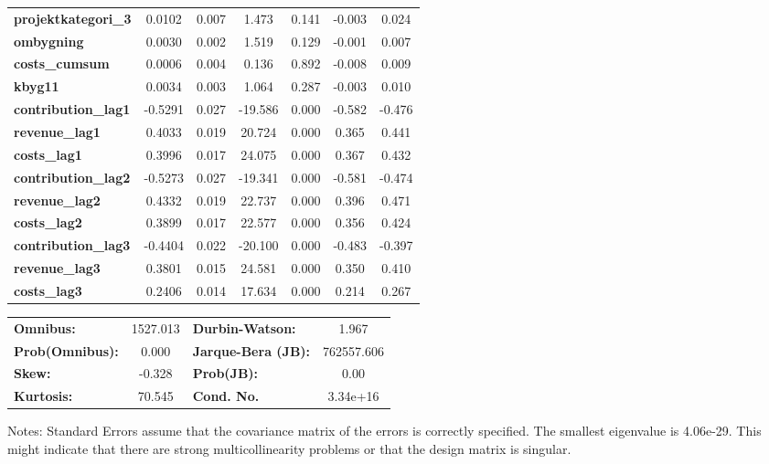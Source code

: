 \begin{center}
\begin{tabular}{lcccccc}
\textbf{projektkategori\_3}  &       0.0102  &        0.007     &     1.473  &         0.141        &       -0.003    &        0.024     \\
\textbf{ombygning}           &       0.0030  &        0.002     &     1.519  &         0.129        &       -0.001    &        0.007     \\
\textbf{costs\_cumsum}       &       0.0006  &        0.004     &     0.136  &         0.892        &       -0.008    &        0.009     \\
\textbf{kbyg11}              &       0.0034  &        0.003     &     1.064  &         0.287        &       -0.003    &        0.010     \\
\textbf{contribution\_lag1}  &      -0.5291  &        0.027     &   -19.586  &         0.000        &       -0.582    &       -0.476     \\
\textbf{revenue\_lag1}       &       0.4033  &        0.019     &    20.724  &         0.000        &        0.365    &        0.441     \\
\textbf{costs\_lag1}         &       0.3996  &        0.017     &    24.075  &         0.000        &        0.367    &        0.432     \\
\textbf{contribution\_lag2}  &      -0.5273  &        0.027     &   -19.341  &         0.000        &       -0.581    &       -0.474     \\
\textbf{revenue\_lag2}       &       0.4332  &        0.019     &    22.737  &         0.000        &        0.396    &        0.471     \\
\textbf{costs\_lag2}         &       0.3899  &        0.017     &    22.577  &         0.000        &        0.356    &        0.424     \\
\textbf{contribution\_lag3}  &      -0.4404  &        0.022     &   -20.100  &         0.000        &       -0.483    &       -0.397     \\
\textbf{revenue\_lag3}       &       0.3801  &        0.015     &    24.581  &         0.000        &        0.350    &        0.410     \\
\textbf{costs\_lag3}         &       0.2406  &        0.014     &    17.634  &         0.000        &        0.214    &        0.267     \\
\bottomrule
\end{tabular}
\begin{tabular}{lclc}
\textbf{Omnibus:}       & 1527.013 & \textbf{  Durbin-Watson:     } &     1.967   \\
\textbf{Prob(Omnibus):} &   0.000  & \textbf{  Jarque-Bera (JB):  } & 762557.606  \\
\textbf{Skew:}          &  -0.328  & \textbf{  Prob(JB):          } &      0.00   \\
\textbf{Kurtosis:}      &  70.545  & \textbf{  Cond. No.          } &  3.34e+16   \\
\bottomrule
\end{tabular}
\end{center}

Notes: \newline
 [1] Standard Errors assume that the covariance matrix of the errors is correctly specified. \newline
 [2] The smallest eigenvalue is 4.06e-29. This might indicate that there are \newline
 strong multicollinearity problems or that the design matrix is singular.